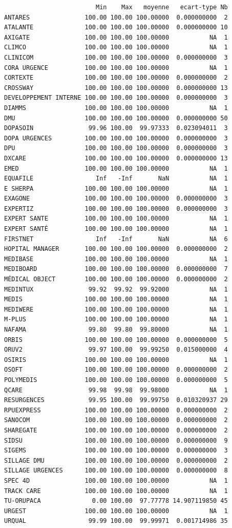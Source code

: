\documentclass[]{article}
\begin{document}
\begin{verbatim}
                         Min    Max   moyenne   ecart-type Nb
ANTARES               100.00 100.00 100.00000  0.000000000  2
ATALANTE              100.00 100.00 100.00000  0.000000000 10
AXIGATE               100.00 100.00 100.00000           NA  1
CLIMCO                100.00 100.00 100.00000           NA  1
CLINICOM              100.00 100.00 100.00000  0.000000000  3
CORA URGENCE          100.00 100.00 100.00000           NA  1
CORTEXTE              100.00 100.00 100.00000  0.000000000  2
CROSSWAY              100.00 100.00 100.00000  0.000000000 13
DEVELOPPEMENT INTERNE 100.00 100.00 100.00000  0.000000000  3
DIAMMS                100.00 100.00 100.00000           NA  1
DMU                   100.00 100.00 100.00000  0.000000000 50
DOPASOIN               99.96 100.00  99.97333  0.023094011  3
DOPA URGENCES         100.00 100.00 100.00000  0.000000000  3
DPU                   100.00 100.00 100.00000  0.000000000  3
DXCARE                100.00 100.00 100.00000  0.000000000 13
EMED                  100.00 100.00 100.00000           NA  1
EQUAFILE                 Inf   -Inf       NaN           NA  1
E SHERPA              100.00 100.00 100.00000           NA  1
EXAGONE               100.00 100.00 100.00000  0.000000000  3
EXPERTIZ              100.00 100.00 100.00000  0.000000000  3
EXPERT SANTE          100.00 100.00 100.00000           NA  1
EXPERT SANTÉ          100.00 100.00 100.00000           NA  1
FIRSTNET                 Inf   -Inf       NaN           NA  6
HOPITAL MANAGER       100.00 100.00 100.00000  0.000000000  2
MEDIBASE              100.00 100.00 100.00000           NA  1
MEDIBOARD             100.00 100.00 100.00000  0.000000000  7
MÉDICAL OBJECT        100.00 100.00 100.00000  0.000000000  2
MEDINTUX               99.92  99.92  99.92000           NA  1
MEDIS                 100.00 100.00 100.00000           NA  1
MEDIWERE              100.00 100.00 100.00000           NA  1
M-PLUS                100.00 100.00 100.00000           NA  1
NAFAMA                 99.80  99.80  99.80000           NA  1
ORBIS                 100.00 100.00 100.00000  0.000000000  5
ORUV2                  99.97 100.00  99.99250  0.015000000  4
OSIRIS                100.00 100.00 100.00000           NA  1
OSOFT                 100.00 100.00 100.00000  0.000000000  2
POLYMEDIS             100.00 100.00 100.00000  0.000000000  5
QCARE                  99.98  99.98  99.98000           NA  1
RESURGENCES            99.95 100.00  99.99750  0.010320937 29
RPUEXPRESS            100.00 100.00 100.00000  0.000000000  2
SANOCOM               100.00 100.00 100.00000  0.000000000  2
SHAREGATE             100.00 100.00 100.00000  0.000000000  2
SIDSU                 100.00 100.00 100.00000  0.000000000  9
SIGEMS                100.00 100.00 100.00000  0.000000000  3
SILLAGE DMU           100.00 100.00 100.00000  0.000000000  2
SILLAGE URGENCES      100.00 100.00 100.00000  0.000000000  8
SPEC 4D               100.00 100.00 100.00000           NA  1
TRACK CARE            100.00 100.00 100.00000           NA  1
TU-ORUPACA              0.00 100.00  97.77778 14.907119850 45
URGEST                100.00 100.00 100.00000           NA  1
URQUAL                 99.99 100.00  99.99971  0.001714986 35
\end{verbatim}
\end{document}
